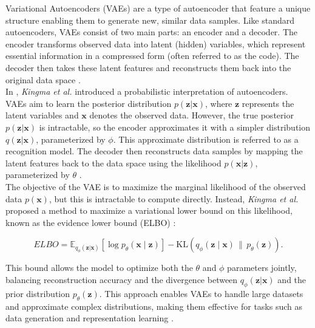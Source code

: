 Variational Autoencoders (VAEs) are a type of autoencoder that feature a unique structure enabling them to generate new, similar data samples. Like standard autoencoders, VAEs consist of two main parts: an encoder and a decoder. The encoder transforms observed data into latent (hidden) variables, which represent essential information in a compressed form (often referred to as the code). The decoder then takes these latent features and reconstructs them back into the original data space \cite{kingma_auto-encoding_2013}.
\\
In \cite{kingma_auto-encoding_2013}, \textit{Kingma et al.} introduced a probabilistic interpretation of autoencoders. VAEs aim to learn the posterior distribution \( p(\mathbf{z}|\mathbf{x}) \), where \( \mathbf{z} \) represents the latent variables and \( \mathbf{x} \) denotes the observed data. However, the true posterior \( p(\mathbf{z}|\mathbf{x}) \) is intractable, so the encoder approximates it with a simpler distribution \( q(\mathbf{z}|\mathbf{x}) \), parameterized by \( \phi \). This approximate distribution is referred to as a recognition model. The decoder then reconstructs data samples by mapping the latent features back to the data space using the likelihood \( p(\mathbf{x}|\mathbf{z}) \), parameterized by \( \theta \) \cite{kingma_auto-encoding_2013}.
\\
The objective of the VAE is to maximize the marginal likelihood of the observed data \( p(\mathbf{x}) \), but this is intractable to compute directly. Instead, \textit{Kingma et al.} proposed a method to maximize a variational lower bound on this likelihood, known as the evidence lower bound (ELBO) \cite{kingma_introduction_2019}:

\begin{equation}
ELBO = \mathbb{E}_{q_\phi(\mathbf{z|x})} \left[ \log p_\theta(\mathbf{x} \mid \mathbf{z}) \right] - \mathrm{KL} \left( q_\phi(\mathbf{z} \mid \mathbf{x}) \, \| \, p_\theta(\mathbf{z}) \right).
\end{equation}

\noindent This bound allows the model to optimize both the \( \theta \) and \( \phi \) parameters jointly, balancing reconstruction accuracy and the divergence between \( q_\phi(\mathbf{z}|\mathbf{x}) \) and the prior distribution \( p_\theta(\mathbf{z}) \). This approach enables VAEs to handle large datasets and approximate complex distributions, making them effective for tasks such as data generation and representation learning \cite{kingma_introduction_2019}.

